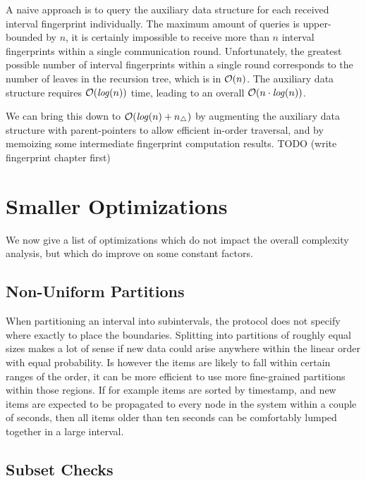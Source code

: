 A naive approach is to query the auxiliary data structure for each received interval fingerprint individually. The maximum amount of queries is upper-bounded by $n$, it is certainly impossible to receive more than $n$ interval fingerprints within a single communication round. Unfortunately, the greatest possible number of interval fingerprints within a single round corresponds to the number of leaves in the recursion tree, which is in $\mathcal{O}(n)$. The auxiliary data structure requires $\mathcal{O}(\mathit{log}(n))$ time, leading to an overall $\mathcal{O}(n \cdot \mathit{log}(n))$.

We can bring this down to $\mathcal{O}(\mathit{log}(n) + n_{\triangle})$ by augmenting the auxiliary data structure with parent-pointers to allow efficient in-order traversal, and by memoizing some intermediate fingerprint computation results. TODO (write fingerprint chapter first)

\section{Smaller Optimizations}
\label{set-reconciliation-simple-optimizations}

We now give a list of optimizations which do not impact the overall complexity analysis, but which do improve on some constant factors.

\subsection{Non-Uniform Partitions}

When partitioning an interval into subintervals, the protocol does not specify where exactly to place the boundaries. Splitting into partitions of roughly equal sizes makes a lot of sense if new data could arise anywhere within the linear order with equal probability. Is however the items are likely to fall within certain ranges of the order, it can be more efficient to use more fine-grained partitions within those regions. If for example items are sorted by timestamp, and new items are expected to be propagated to every node in the system within a couple of seconds, then all items older than ten seconds can be comfortably lumped together in a large interval.

\subsection{Subset Checks}
\label{subset-checks}

